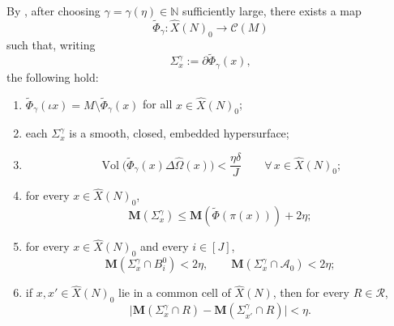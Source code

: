 \documentclass[12pt,english]{article}
\theoremstyle{definition}
\begin{document}
By \cite[Propositions~3.4 and~3.5]{Dey}, after choosing $\gamma=\gamma(\eta)\in\mathbb{N}$ sufficiently large,
there exists a map
\[
\widetilde\Phi_\gamma:\widehat X(N)_0\to \mathcal C(M)
\]
such that, writing
\[
\Sigma_x^\gamma:=\partial \widetilde\Phi_\gamma(x),
\]
the following hold:
\begin{enumerate}
\item[(i)] $\widetilde\Phi_\gamma(\iota x)=M\setminus \widetilde\Phi_\gamma(x)$ for all $x\in\widehat X(N)_0$;
\item[(ii)] each $\Sigma_x^\gamma$ is a smooth, closed, embedded hypersurface;
\item[(iii)]
\[
\operatorname{Vol}\bigl(\widetilde\Phi_\gamma(x)\Delta \widehat\Omega(x)\bigr)<\frac{\eta\delta}{J}
\qquad\forall\,x\in\widehat X(N)_0;
\]
\item[(iv)] for every $x\in\widehat X(N)_0$,
\[
\mathbf M(\Sigma_x^\gamma)\le \mathbf M(\tilde\Phi(\pi(x)))+2\eta;
\]
\item[(v)] for every $x\in\widehat X(N)_0$ and every $i\in[J]$,
\[
\mathbf M(\Sigma_x^\gamma\cap B_i^0)<2\eta,
\qquad
\mathbf M(\Sigma_x^\gamma\cap \mathcal A_0)<2\eta;
\]
\item[(vi)] if $x,x'\in\widehat X(N)_0$ lie in a common cell of $\widehat X(N)$, then for every
$R\in\mathcal R$,
\[
\bigl|\mathbf M(\Sigma_x^\gamma\cap R)-\mathbf M(\Sigma_{x'}^\gamma\cap R)\bigr|<\eta.
\]
\end{enumerate}
\end{document}
